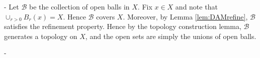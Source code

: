 \documentclass[12pt]{article}
\makeatletter
\theoremstyle{ex215}
\newcounter{probcount}
\newlength\probsep
\newlength\pshrinking
\newenvironment{problems}%
  {\ifhmode\unskip\par\fi\setcounter{probcount}{0}\probsep\parskip
  \sbox\@tempboxa{\textbf{9.}}\pshrinking\wd\@tempboxa\advance\pshrinking\labelsep
  \advance\linewidth -\pshrinking
  \advance\@totalleftmargin\pshrinking
  \advance\leftskip\pshrinking}%
  {\ifhmode\unskip \par\fi\advance\leftskip-\pshrinking}%
\makeatother
\begin{document}
\begin{problems}
Let $\mathcal{B}$ be the collection of open balls in $X$.  Fix $x\in X$ and note
that $\cup_{r>0} B_r(x)=X$.  Hence $\mathcal{B}$ covers $X$.  Moreover, by Lemma
\ref{lem:DAMrefine}, $\mathcal{B}$ satisfies the refinement property.  Hence
by the topology construction lemma, $\mathcal{B}$ generates a topology on $X$,
and the open sets are simply the unions of open balls.

\end{problems}
\end{document}
